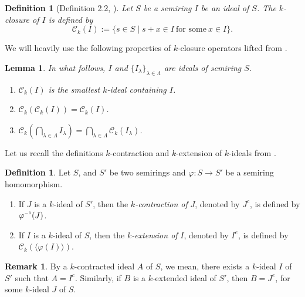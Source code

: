 \documentclass[11pt,english]{amsart}
\newcommand{\inv}{^{\raisebox{.2ex}{$\scriptscriptstyle-1$}}}
\newtheorem{lemma}[theorem]{Lemma}
\theoremstyle{definition}
\newtheorem{definition}[theorem]{Definition}
\newtheorem{remark}[theorem]{Remark}
\numberwithin{equation}{section}
\begin{document}
\begin{definition}[Definition 2.2, \cite{GoswamiDube24}]
    \textit{Let $S$ be a semiring $I$ be an ideal of $S$. The $k$-closure of $I$ is defined by}
    \[
    \mathcal{C}_k(I) :=\{s\in S\mid s+x\in I\ \text{for some} \ x\in I\}.
    \]
\end{definition}

We will heavily use the following properties of $k$-closure operators lifted from \cite[Lemma 2.3]{GoswamiDube24}.

\begin{lemma}
In what follows, $I$ and $\{I_\lambda\}_{\lambda\in \Lambda}$ are ideals of semiring $S$.
\begin{enumerate} 
        
\item $\mathcal{C}_k(I)$ is the smallest $k$-ideal containing $I$.
        
\item $\mathcal{C}_k(\mathcal{C}_k(I))=\mathcal{C}_k(I)$.
        
\item $\mathcal{C}_k(\bigcap_{\lambda\in \Lambda}I_\lambda)=\bigcap_{\lambda\in \Lambda}\mathcal{C}_k(I_\lambda)$.
\end{enumerate}
\end{lemma}

Let us recall the definitions $k$-contraction and $k$-extension of $k$-ideals from \cite[Definition 4.1]{GoswamiDube24}.

\begin{definition} 
	Let $S$, and $S'$ be two semirings and $\varphi\colon S\to S'$ be a semiring homomorphism. 
	\begin{enumerate}
		\item If $J$ is a $k$-ideal of $S'$, then the \emph{$k$-contraction of} $J$, denoted by $J^c$, is defined by $\varphi\inv(J)$.
		\item If $I$ is a $k$-ideal of $S$, then the \emph{$k$-extension of} $I$, denoted by $I^e$, is defined by $\mathcal{C}_k(\langle\varphi(I)\rangle)$.
	\end{enumerate}    
\end{definition}

\begin{remark}
	By a $k$-contracted ideal $A$ of $S$, we mean, there exists a $k$-ideal $I$ of $S'$ such that $A=I^c$. Similarly, if $B$ is a $k$-extended ideal of $S'$, then $B=J^e$, for some $k$-ideal $J$ of $S$.
\end{remark}
\end{document}
